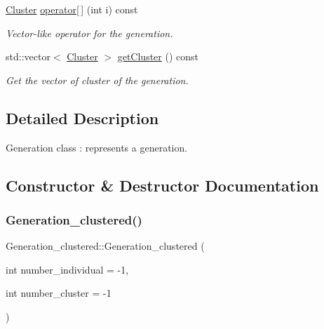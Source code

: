 \begin{DoxyCompactItemize}
\hyperlink{class_cluster}{Cluster} \hyperlink{class_generation__clustered_a91d8016a9ce56103000902be5c1acd1c}{operator\mbox{[}$\,$\mbox{]}} (int i) const
\begin{DoxyCompactList}\small\item\em Vector-\/like operator for the generation. \end{DoxyCompactList}\item 
std\+::vector$<$ \hyperlink{class_cluster}{Cluster} $>$ \hyperlink{class_generation__clustered_ab45fdeb57a0d04cda57a5f023e132859}{get\+Cluster} () const
\begin{DoxyCompactList}\small\item\em Get the vector of cluster of the generation. \end{DoxyCompactList}\end{DoxyCompactItemize}


\subsection{Detailed Description}
Generation class \+: represents a generation. 

\subsection{Constructor \& Destructor Documentation}
\mbox{\label{class_generation__clustered_a823bc0f5f9997d846386f9032455909b}} 
\subsubsection{\texorpdfstring{Generation\+\_\+clustered()}{Generation\_clustered()}\hspace{0.1cm}{\footnotesize\ttfamily [1/2]}}
{\footnotesize\ttfamily Generation\+\_\+clustered\+::\+Generation\+\_\+clustered (\begin{DoxyParamCaption}\item[{int}]{number\+\_\+individual = {\ttfamily -\/1},  }\item[{int}]{number\+\_\+cluster = {\ttfamily -\/1} }\end{DoxyParamCaption})}



